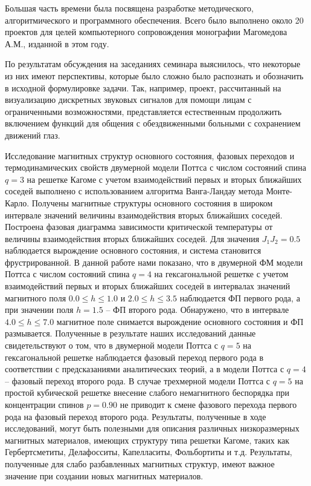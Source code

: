  

Большая часть времени была посвящена разработке методического, алгоритмического и программного обеспечения. Всего было выполнено около 20 проектов для целей компьютерного сопровождения монографии Магомедова А.М., изданной в этом году.

По результатам обсуждения на заседаниях семинара выяснилось, что некоторые из них имеют перспективы, которые было сложно было распознать и обозначить в исходной формулировке задачи. Так, например, проект, рассчитанный на визуализацию дискретных звуковых сигналов для помощи лицам с ограниченными возможностями, представляется естественным продолжить включением функций для общения с обездвиженными больными с сохранением движений глаз. 


Исследование магнитных структур основного состояния, фазовых переходов и
термодинамических свойств двумерной модели Поттса с числом состояний спина $q=3$ на решетке
Кагоме с учетом взаимодействий первых и вторых ближайших соседей выполнено с
использованием алгоритма Ванга-Ландау метода Монте-Карло. Получены магнитные структуры
основного состояния в широком интервале значений величины взаимодействия вторых
ближайших соседей. Построена фазовая диаграмма зависимости критической температуры от
величины взаимодействия вторых ближайших соседей. Для значения $J_1J_2=0.5$ наблюдается 
вырождение основного состояния, и система становится фрустрированной.
В данной работе нами показано, что в двумерной ФМ модели Поттса с числом состояний
спина $q=4$ на гексагональной решетке с учетом взаимодействий первых и вторых ближайших
соседей в интервалах значений магнитного поля $0.0 \le h \le 1.0$ и $2.0 \le h \le 3.5$ наблюдается ФП
первого рода, а при значении поля $h = 1.5$ -- ФП второго рода. Обнаружено, что в интервале $4.0 \le h
\le 7.0$ магнитное поле снимается вырождение основного состояния и ФП размывается.
Полученные в результате наших исследований данные свидетельствуют о том, что в
двумерной модели Поттса с $q=5$ на гексагональной решетке наблюдается фазовый переход
первого рода в соответствии с предсказаниями аналитических теорий, а в модели Поттса с $q=4$ --
фазовый переход второго рода. В случае трехмерной модели Поттса с $q=5$ на простой кубической
решетке внесение слабого немагнитного беспорядка при концентрации спинов $p=0.90$ не приводит
к смене фазового перехода первого рода на фазовый переход второго рода.
Результаты, полученные в ходе исследований, могут быть полезными для описания
различных низкоразмерных магнитных материалов, имеющих структуру типа решетки Кагоме,
таких как Гербертсметиты, Делафосситы, Капелласиты, Фольбортиты и т.д. Результаты,
полученные для слабо разбавленных магнитных структур, имеют важное значение при создании
новых магнитных материалов.